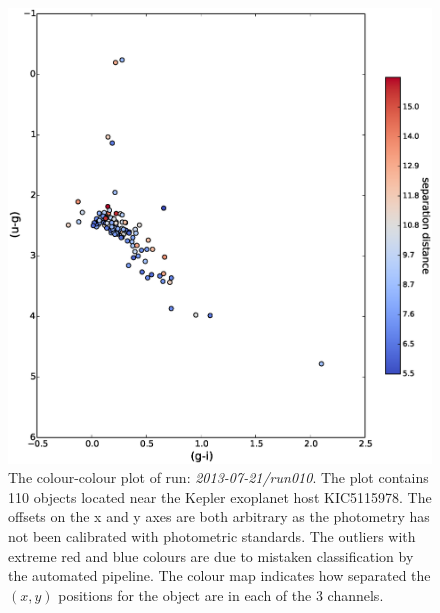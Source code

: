 \begin{figure}
\centering
\includegraphics[width=140mm]{images/2013-07-21-run010-2colour.eps}
\caption{The colour-colour plot of run: \emph{2013-07-21/run010}. The plot contains 110 objects located near the Kepler exoplanet host KIC5115978. The offsets on the x and y axes are both arbitrary as the photometry has not been calibrated with photometric standards. The outliers with extreme red and blue colours are due to mistaken classification by the automated pipeline. The colour map indicates how separated the $(x, y)$ positions for the object are in each of the 3 channels.}
\label{fig:run010-2colour}
\end{figure}

